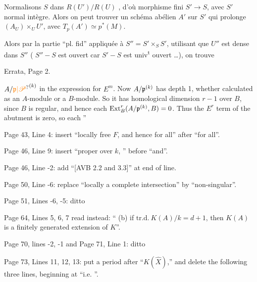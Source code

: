 Normalisons $S$ dans $R(U')/R(U)$ , d'où morphisme fini  $S'\longrightarrow S$,  avec $S'$ normal intègre. Alors on peut trouver un schéma abélien $A'$ sur $S'$ qui prolonge $(A_U)\times_U U'$, avec $T_p(A')\simeq p^*(M)$.

Alors par la partie ``pl. fid'' appliquée à $S''=S'\times_S S'$, utilisant que $U''$ est dense dans $S''$ (  $S''-S$ est ouvert car $S'-S$ est univ\textsuperscript{t} ouvert \ldots), on trouve


Errata, Page 2.

$A/\handwritten{\unsure{\mathfrak p|\mathscr P}}^{(k)}$ in the expression for $E^m$. Now $A/\mathfrak p^{(k)}$ has depth 1, whether calculated as an $A$-module or a $B$-module. So it has homological dimension $r-1$ over $B$, since $B$ is regular, and hence each $\operatorname{Ext}^r_B(A/\mathfrak p^{(k)},B)=0$. Thus the $E^r$ term of the abutment is zero, so each ''

Page 43, Line 4: insert ``locally free $F$, and hence for all'' after ``for all''.

Page 46, Line 9: insert ``proper over $k$, '' before ``and''.

Page 46, Line -2: add ``[AVB 2.2 and 3.3]'' at end of line.

Page 50, Line -6: replace ``locally a complete intersection'' by ``non-singular''.

Page 51, Lines -6, -5: ditto

Page 64, Lines 5, 6, 7 read instead: `` (b) if $\mathrm{tr.d.}\ K(A)/k=d+1$, then $K(A)$ is a finitely generated extension of $K$''.

Page 70, lines -2, -1 and Page 71, Line 1: ditto

Page 73, Lines 11, 12, 13: put a period after ``$K(\hat X)$,'' and delete the following three lines, beginning at ``i.e. ''.

